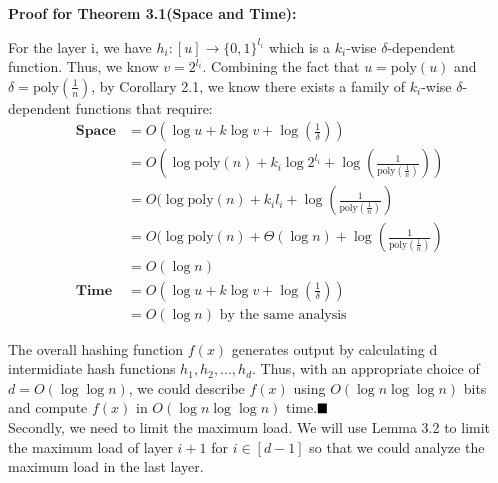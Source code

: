 \documentclass[a4paper, english]{paper}
\begin{document}
	\noindent\textbf{Proof for Theorem 3.1(Space and Time):} \par
	For the layer i, we have $h_i:[u]\rightarrow\{0,1\}^{l_i}$ which is a $k_i$-wise $\delta$-dependent function. Thus, we know $v = 2^{l_i}$. Combining the fact that $u = \text{poly}(u)$ and $\delta=\text{poly}(\frac1n)$, by Corollary 2.1, we know there exists a family of $k_i$-wise $\delta$-dependent functions that require:
\begin{align*}
\textbf{Space} &= O(\log u+k\log v+\log(\frac1\delta))\\
&= O(\log \text{poly}(n) + k_i\log 2^{l_i}+\log(\frac1{\text{poly}(\frac1n)}))\\
&= O(\log \text{poly}(n) + k_il_i+\log(\frac1{\text{poly}(\frac1n)})\\
&= O(\log \text{poly}(n) + \Theta(\log n)+\log(\frac1{\text{poly}(\frac1n)})\\
&= O(\log n)\\
\textbf{Time} &= O(\log u+k\log v+\log(\frac1\delta))\\
&=  O(\log n)\text{ by the same analysis}
\end{align*}\par
 The overall hashing function $f(x)$ generates output by calculating d intermidiate hash functions $h_1,h_2,...,h_d$. Thus, with an appropriate choice of $d= O(\log\log n)$, we could describe $f(x)$ using $O(\log n\log\log n)$ bits and compute $f(x)$ in $O(\log n\log\log n)$ time.$\hfill\blacksquare$\\

	Secondly, we need to limit the maximum load. We will use Lemma 3.2 to limit the maximum load of layer $i+1$ for $i\in[d-1]$ so that we could analyze the maximum load in the last layer.
	
\end{document}
